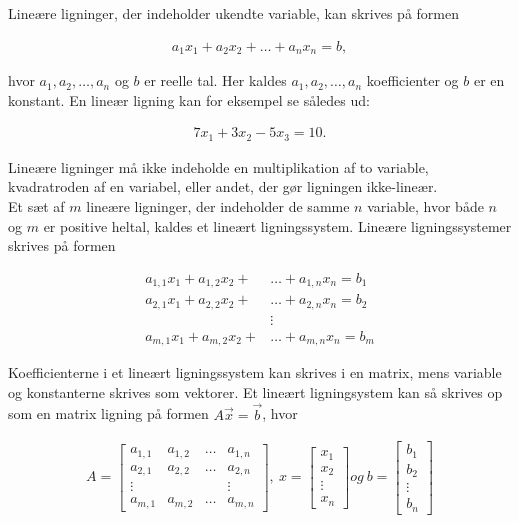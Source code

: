 \label{afsnit:lign_sys}
Lineære ligninger, der indeholder ukendte variable, kan skrives på formen

\begin{align*}
a_1x_1+a_2x_2+ \dots +a_nx_n = b,
\end{align*}

hvor $a_1, a_2, \dots , a_n$ og $b$ er reelle tal. 
Her kaldes $a_1,a_2, \dots , a_n$ koefficienter og $b$ er en konstant. En lineær ligning kan for eksempel se således ud:

\begin{align*}
7x_1+3x_2-5x_3 = 10.
\end{align*}

Lineære ligninger må ikke indeholde en multiplikation af to variable, kvadratroden af en variabel, eller andet, der gør ligningen ikke-lineær. \\
Et sæt af $m$ lineære ligninger, der indeholder de samme $n$ variable, hvor både $n$ og $m$ er positive heltal, kaldes et lineært ligningssystem. Lineære ligningssystemer skrives på formen

\begin{align*}
a_{1,1}x_1+a_{1,2}x_2+ &\dots +a_{1,n}x_n = b_1\\
a_{2,1}x_1+a_{2,2}x_2+ &\dots +a_{2,n}x_n = b_2\\
&\vdots \\
a_{m,1}x_1+a_{m,2}x_2+ &\dots +a_{m,n}x_n = b_m
\end{align*}

Koefficienterne i et lineært ligningssystem kan skrives i en matrix, mens variable og konstanterne skrives som vektorer. Et lineært ligningsystem kan så skrives op som en matrix ligning på formen $A \vec{x} = \vec{b}$, hvor

\begin{align*}
A= \begin{bmatrix}
a_{1,1} & a_{1,2} & \dots & a_{1,n} \\
a_{2,1} & a_{2,2} & \dots & a_{2,n} \\
\vdots  &         &       & \vdots  \\
a_{m,1} & a_{m,2} & \dots & a_{m,n}
\end{bmatrix}, \ 
x= \begin{bmatrix}
x_1 \\
x_2 \\
\vdots \\
x_n
\end{bmatrix} og \ 
b= \begin{bmatrix}
b_1 \\
b_2 \\
\vdots \\
b_n
\end{bmatrix}
\end{align*}

